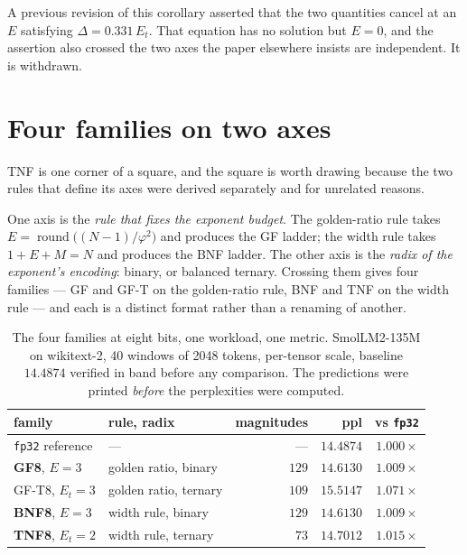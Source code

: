 \documentclass[11pt]{article}
\theoremstyle{definition}
\begin{document}
A previous revision of this corollary asserted that the two quantities cancel at
an $E$ satisfying $\Delta = 0.331\,E_t$. That equation has no solution but
$E = 0$, and the assertion also crossed the two axes the paper elsewhere insists
are independent. It is withdrawn.


\section{Four families on two axes}\label{sec:fourfamilies}

TNF is one corner of a square, and the square is worth drawing because the two
rules that define its axes were derived separately and for unrelated reasons.

One axis is the \emph{rule that fixes the exponent budget}. The golden-ratio
rule takes $E=\operatorname{round}\!\bigl((N-1)/\varphi^{2}\bigr)$ and produces
the GF ladder; the width rule takes $1+E+M=N$ and produces the BNF ladder. The
other axis is the \emph{radix of the exponent's encoding}: binary, or balanced
ternary. Crossing them gives four families --- GF and GF-T on the golden-ratio
rule, BNF and TNF on the width rule --- and each is a distinct format rather
than a renaming of another.

\begin{table}[t]\centering
\caption{The four families at eight bits, one workload, one metric.
SmolLM2-135M on wikitext-2, 40 windows of 2048 tokens, per-tensor scale,
baseline $14.4874$ verified in band before any comparison. The predictions were
printed \emph{before} the perplexities were computed.}
\label{tab:fourfam}
\begin{tabular}{llrrr}
\toprule
family & rule, radix & magnitudes & ppl & vs \texttt{fp32} \\
\midrule
\texttt{fp32} reference & --- & --- & $14.4874$ & $1.000\times$ \\
\midrule
\textbf{GF8}, $E{=}3$   & golden ratio, binary  & $129$ & $\mathbf{14.6130}$ & $1.009\times$ \\
GF-T8, $E_t{=}3$        & golden ratio, ternary & $109$ & $15.5147$ & $1.071\times$ \\
\textbf{BNF8}, $E{=}3$  & width rule, binary    & $129$ & $\mathbf{14.6130}$ & $1.009\times$ \\
\textbf{TNF8}, $E_t{=}2$& width rule, ternary   & $73$  & $\mathbf{14.7012}$ & $1.015\times$ \\
\bottomrule
\end{tabular}
\end{table}
\end{document}
